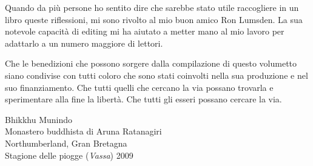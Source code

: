 \clearpage

Quando da più persone ho sentito dire che sarebbe stato utile
raccogliere in un libro queste riflessioni, mi sono rivolto al mio buon
amico Ron Lumsden. La sua notevole capacità di editing mi ha aiutato a
metter mano al mio lavoro per adattarlo a un numero maggiore di lettori.

Che le benedizioni che possono sorgere dalla compilazione di questo
volumetto siano condivise con tutti coloro che sono stati coinvolti
nella sua produzione e nel suo finanziamento. Che tutti quelli che
cercano la via possano trovarla e sperimentare alla fine la libertà. Che
tutti gli esseri possano cercare la via.

\bigskip

{\par\raggedleft
Bhikkhu Munindo\\
Monastero buddhista di Aruna Ratanagiri\\
Northumberland, Gran Bretagna\\
Stagione delle piogge (\emph{Vassa}) 2009
\par}
